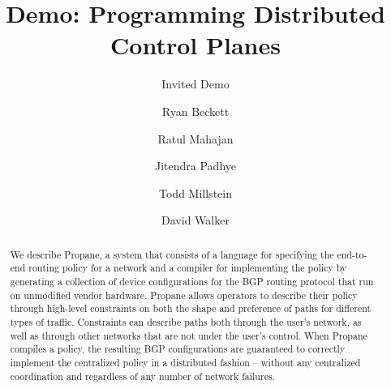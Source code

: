\documentclass[10pt]{sig-alternate}
\newcommand{\sysname}{{\small \sf Propane}\xspace}
\begin{document}
\title{Demo: Programming Distributed Control Planes}
\subtitle{Invited Demo}
 
\author{%
Ryan Beckett\\
\and
Ratul Mahajan\\
\and
Jitendra Padhye\\
\and
Todd Millstein\\
\and
David Walker\\
}


\maketitle


\begin{abstract} 
We describe \sysname, a system that consists of a language for specifying the end-to-end routing policy for a network and a compiler for implementing the policy by generating a collection of device configurations for the BGP routing protocol that run on unmodified vendor hardware. \sysname allows operators to describe their policy through high-level constraints on both the shape and preference of paths for different types of traffic. Constraints can describe paths both through the user's network, as well as through other networks that are not under the user's control.
When \sysname compiles a policy, the resulting BGP configurations are guaranteed to 
correctly implement the centralized policy in a distributed fashion -- without any centralized coordination and regardless of any number of network failures.
\end{abstract}

%
%
%
%
\end{document}
